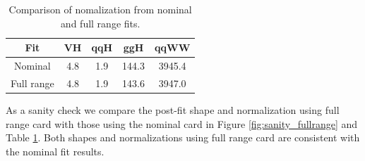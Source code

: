 %
\begin{table}
\begin{center}
\begin{tabular}{c|cccc}
\hline
Fit         & VH    & qqH   & ggH   & qqWW          \\
\hline
Nominal     & 4.8   & 1.9   & 144.3 &  3945.4       \\
Full range  & 4.8   & 1.9   & 143.6 &  3947.0       \\
\hline
\end{tabular}
\end{center}
\caption{Comparison of nomalization from nominal and full range fits.} 
\label{tab:sanity_fullrange}
\end{table}
As a sanity check we compare the post-fit shape and normalization 
using full range card with those using the nominal card in Figure \ref{fig:sanity_fullrange} and 
Table \ref{tab:sanity_fullrange}. Both shapes and normalizations using full range card 
are consistent with the nominal fit results. 

